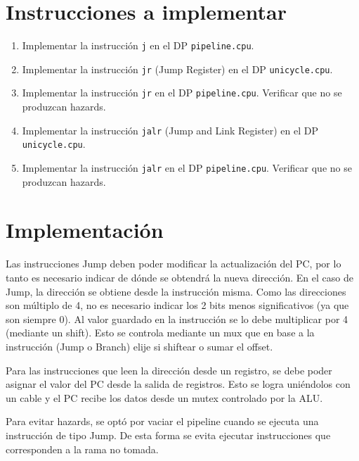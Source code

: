 \documentclass[11pt,a4paper, spanish]{article}
\begin{document}
\section{Instrucciones a implementar}

\begin{enumerate}
  \item Implementar la instrucción \texttt{j} en el DP \texttt{pipeline.cpu}.
  \item Implementar la instrucción \texttt{jr} (Jump Register) en el DP \texttt{unicycle.cpu}.
  \item Implementar la instrucción \texttt{jr} en el DP \texttt{pipeline.cpu}. Verificar que no se produzcan hazards.
  \item Implementar la instrucción \texttt{jalr} (Jump and Link Register) en el DP \texttt{unicycle.cpu}.
  \item Implementar la instrucción \texttt{jalr} en el DP \texttt{pipeline.cpu}. Verificar que no se produzcan hazards.
\end{enumerate}

\pagebreak

\section{Implementación}

Las instrucciones Jump deben poder modificar la actualización del PC, por lo tanto es
necesario indicar de dónde se obtendrá la nueva dirección. En el caso de Jump,
la dirección se obtiene desde la instrucción misma. Como las direcciones son múltiplo
de 4, no es necesario indicar los 2 bits menos significativos (ya que son siempre 0).
Al valor guardado en la instrucción se lo debe multiplicar por 4 (mediante un shift).
Esto se controla mediante un mux que en base a la instrucción (Jump o Branch) elije si
shiftear o sumar el offset.

Para las instrucciones que leen la dirección desde un registro, se debe poder asignar
el valor del PC desde la salida de registros. Esto se logra uniéndolos con un cable
y el PC recibe los datos desde un mutex controlado por la ALU.

Para evitar hazards, se optó por vaciar el pipeline cuando se ejecuta una instrucción
de tipo Jump. De esta forma se evita ejecutar instrucciones que corresponden a la rama
no tomada.
\end{document}
